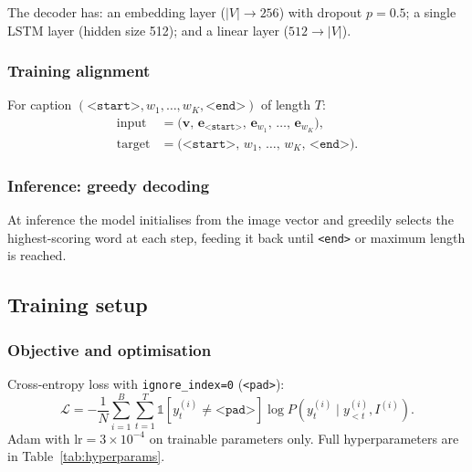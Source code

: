 \documentclass{article}
\begin{document}
The decoder has: an embedding layer ($|V| \to 256$) with dropout $p=0.5$; a single LSTM layer (hidden size 512); and a linear layer ($512 \to |V|$).

\subsubsection{Training alignment}

For caption $(\texttt{<start>}, w_1, \dots, w_K, \texttt{<end>})$ of length $T$:
\begin{align*}
  \text{input}  &= \big(\mathbf{v},\, \mathbf{e}_{\texttt{<start>}},\,
                    \mathbf{e}_{w_1},\, \dots,\, \mathbf{e}_{w_K}\big), \\
  \text{target} &= \big(\texttt{<start>},\, w_1,\, \dots,\, w_K,\,
                    \texttt{<end>}\big).
\end{align*}

\subsubsection{Inference: greedy decoding}

At inference the model initialises from the image vector and greedily selects the highest-scoring word at each step, feeding it back until \texttt{<end>} or maximum length is reached.

\subsection{Training setup}

\subsubsection{Objective and optimisation}

Cross-entropy loss with \texttt{ignore\_index=0} (\texttt{<pad>}):
\begin{equation}
  \mathcal{L} = - \frac{1}{N} \sum_{i=1}^{B} \sum_{t=1}^{T}
  \mathbb{1}\!\left[ y^{(i)}_t \neq \texttt{<pad>} \right]
  \log P\!\left( y^{(i)}_t \mid y^{(i)}_{<t}, I^{(i)} \right).
\end{equation}
Adam \citep{kingma2014adam} with $\text{lr} = 3 \times 10^{-4}$ on trainable
parameters only. Full hyperparameters are in Table~\ref{tab:hyperparams}.
\end{document}
